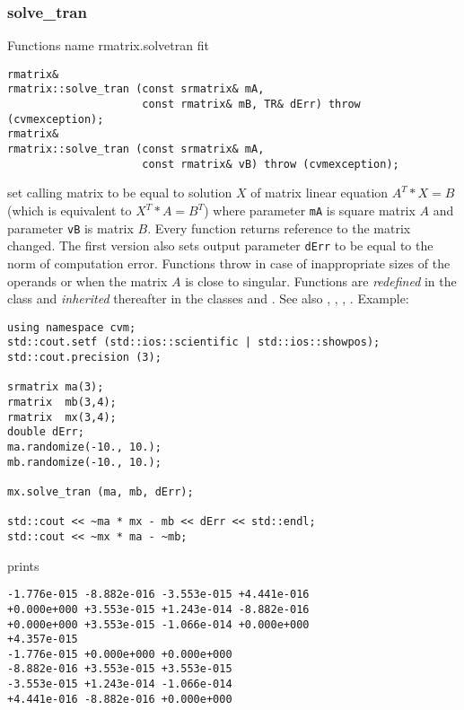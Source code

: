 \subsubsection{solve\_tran}
Functions%
\pdfdest name {rmatrix.solvetran} fit
\begin{verbatim}
rmatrix&
rmatrix::solve_tran (const srmatrix& mA,
                     const rmatrix& mB, TR& dErr) throw (cvmexception);
rmatrix&
rmatrix::solve_tran (const srmatrix& mA,
                     const rmatrix& vB) throw (cvmexception);
\end{verbatim}
set calling matrix to be equal to  solution $X$ of 
matrix linear equation
$A^T*X=B$ (which is equivalent to $X^T*A=B^T$)
where parameter \verb"mA" is square matrix $A$
and parameter \verb"vB" is matrix $B$.
Every function returns  reference to the matrix changed.
The first version also sets  output parameter \verb"dErr" to be equal
to the norm of computation error.
Functions throw 
in case of inappropriate sizes
of the operands or when the matrix $A$ is close to singular.
Functions are \emph{redefined} in  the class
 and
\emph{inherited} thereafter in the classes
 and
.
See also
,
,
,
.
Example:
\begin{Verbatim}
using namespace cvm;
std::cout.setf (std::ios::scientific | std::ios::showpos); 
std::cout.precision (3);

srmatrix ma(3);
rmatrix  mb(3,4);
rmatrix  mx(3,4);
double dErr;
ma.randomize(-10., 10.);
mb.randomize(-10., 10.);

mx.solve_tran (ma, mb, dErr);

std::cout << ~ma * mx - mb << dErr << std::endl;
std::cout << ~mx * ma - ~mb;
\end{Verbatim}
prints
\begin{Verbatim}
-1.776e-015 -8.882e-016 -3.553e-015 +4.441e-016
+0.000e+000 +3.553e-015 +1.243e-014 -8.882e-016
+0.000e+000 +3.553e-015 -1.066e-014 +0.000e+000
+4.357e-015
-1.776e-015 +0.000e+000 +0.000e+000
-8.882e-016 +3.553e-015 +3.553e-015
-3.553e-015 +1.243e-014 -1.066e-014
+4.441e-016 -8.882e-016 +0.000e+000
\end{Verbatim}
\newpage







